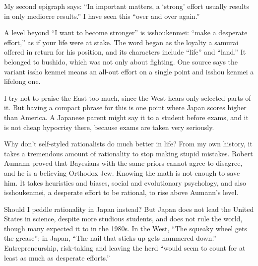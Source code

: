 
My second epigraph says: ``In important matters, a `strong' effort usually results in only mediocre results.'' I have seen this ``over and over again.''

A level beyond ``I want to become stronger'' is isshoukenmei: ``make a desperate effort,'' as if your life were at stake. The word began as the loyalty a samurai offered in return for his position, and its characters include ``life'' and ``land.'' It belonged to bushido, which was not only about fighting. One source says the variant issho kenmei means an all-out effort on a single point and isshou kenmei a lifelong one. 

I try not to praise the East too much, since the West hears only selected parts of it. But having a compact phrase for this is one point where Japan scores higher than America. A Japanese parent might say it to a student before exams, and it is not cheap hypocrisy there, because exams are taken very seriously.

Why don't self-styled rationalists do much better in life? From my own history, it takes a tremendous amount of rationality to stop making stupid mistakes. Robert Aumann proved that Bayesians with the same priors cannot agree to disagree, and he is a believing Orthodox Jew. Knowing the math is not enough to save him. It takes heuristics and biases, social and evolutionary psychology, and also isshoukenmei, a desperate effort to be rational, to rise above Aumann's level. 

Should I peddle rationality in Japan instead? But Japan does not lead the United States in science, despite more studious students, and does not rule the world, though many expected it to in the 1980s. In the West, ``The squeaky wheel gets the grease''; in Japan, ``The nail that sticks up gets hammered down.'' Entrepreneurship, risk-taking and leaving the herd ``would seem to count for at least as much as desperate efforts.'' 

